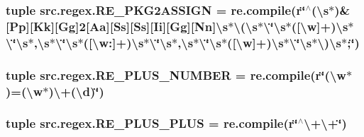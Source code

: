 \hypertarget{namespacesrc_1_1regex_ac4e94f740a8e656b5223f0c51e0a7835}{
\subsubsection[{R\-E\-\_\-\-P\-K\-G2\-A\-S\-S\-I\-G\-N}]{\setlength{\rightskip}{0pt plus 5cm}tuple src.\-regex.\-R\-E\-\_\-\-P\-K\-G2\-A\-S\-S\-I\-G\-N = re.\-compile(r\char`\"{}$^\wedge$(\textbackslash{}s$\ast$)\&\mbox{[}Pp\mbox{]}\mbox{[}Kk\mbox{]}\mbox{[}Gg\mbox{]}2\mbox{[}Aa\mbox{]}\mbox{[}Ss\mbox{]}\mbox{[}Ss\mbox{]}\mbox{[}Ii\mbox{]}\mbox{[}Gg\mbox{]}\mbox{[}Nn\mbox{]}\textbackslash{}s$\ast$\textbackslash{}(\textbackslash{}s$\ast$\textbackslash{}\char`\"{}\textbackslash{}s$\ast$(\mbox{[}\textbackslash{}w\mbox{]}+)\textbackslash{}s$\ast$\textbackslash{}\char`\"{}\textbackslash{}s$\ast$,\textbackslash{}s$\ast$\textbackslash{}\char`\"{}\textbackslash{}s$\ast$(\mbox{[}\textbackslash{}w\-:\mbox{]}+)\textbackslash{}s$\ast$\textbackslash{}\char`\"{}\textbackslash{}s$\ast$,\textbackslash{}s$\ast$\textbackslash{}\char`\"{}\textbackslash{}s$\ast$(\mbox{[}\textbackslash{}w\mbox{]}+)\textbackslash{}s$\ast$\textbackslash{}\char`\"{}\textbackslash{}s$\ast$\textbackslash{})\textbackslash{}s$\ast$;\char`\"{})}}\label{namespacesrc_1_1regex_ac4e94f740a8e656b5223f0c51e0a7835}
\hypertarget{namespacesrc_1_1regex_a64c56edef930bad666a7c52d0b2fdba5}{
\subsubsection[{R\-E\-\_\-\-P\-L\-U\-S\-\_\-\-N\-U\-M\-B\-E\-R}]{\setlength{\rightskip}{0pt plus 5cm}tuple src.\-regex.\-R\-E\-\_\-\-P\-L\-U\-S\-\_\-\-N\-U\-M\-B\-E\-R = re.\-compile(r\char`\"{}(\textbackslash{}w$\ast$)=(\textbackslash{}w$\ast$)\textbackslash{}+(\textbackslash{}d)\char`\"{})}}\label{namespacesrc_1_1regex_a64c56edef930bad666a7c52d0b2fdba5}
\hypertarget{namespacesrc_1_1regex_a65a59c62d114452fd207603a73ad5585}{
\subsubsection[{R\-E\-\_\-\-P\-L\-U\-S\-\_\-\-P\-L\-U\-S}]{\setlength{\rightskip}{0pt plus 5cm}tuple src.\-regex.\-R\-E\-\_\-\-P\-L\-U\-S\-\_\-\-P\-L\-U\-S = re.\-compile(r\char`\"{}$^\wedge$\textbackslash{}+\textbackslash{}+\char`\"{})}}\label{namespacesrc_1_1regex_a65a59c62d114452fd207603a73ad5585}
